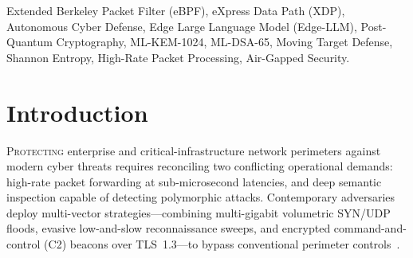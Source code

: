 \documentclass[journal]{IEEEtran}
\renewcommand{\_}{\textunderscore\allowbreak}
\begin{document}
\begin{abstract}
Empirical evaluation on a commodity bare-metal gateway (Quad-Core Intel Core
i5-4570~@ 3.20~GHz, Intel 82574L 1~GbE NIC, Ubuntu Server 22.04 LTS, $N=30$
repeated benchmark runs) demonstrated the following results under the tested
configuration: (1)~a 30-run mean per-packet processing latency of
$0.126 \pm 0.007\,\mu\text{s}$, sustaining $1.495 \pm 0.015\,\text{Mpps}$
(equivalent to $1.18\,\text{Gbps}$ replayed Layer-2 frame throughput) with
$26.2 \pm 0.6\%$ CPU utilization and no observed packet loss under the
evaluated saturation workload; these represent a $5.30\times$ throughput and
$\approx\!210\times$ latency improvement over Linux Netfilter ($p < 10^{-15}$,
95\% CI of difference: $[+1.207,\,+1.218]\,\text{Mpps}$); (2)~the Edge-LLM,
evaluated across 210 strictly held-out scenarios (70\% of the 300-scenario corpus),
demonstrated $98.10\%$ accuracy on unseen inputs; (3)~the entropy-based pre-filter
achieved AUC~$=0.916$ (95\% CI: $[0.885,\,0.947]$) across 500 labeled encrypted
flows as a lightweight triage signal; and (4)~MTD-augmented port hopping increased
sequential Nmap scan duration from $12.4\,\text{s}$ to $4.2\,\text{h}$ under the
specified single-host configuration. The key architectural contribution is the
decoupling of deterministic low-latency enforcement from asynchronous semantic reasoning,
enabling sub-microsecond kernel enforcement while local Edge-LLM cognition executes
off the critical path. All benchmark scripts, raw telemetry logs, eBPF source, and
model configuration are publicly archived in the project GitHub repository.
\end{abstract}

\begin{IEEEkeywords}
Extended Berkeley Packet Filter (eBPF), eXpress Data Path (XDP),
Autonomous Cyber Defense, Edge Large Language Model (Edge-LLM),
Post-Quantum Cryptography, ML-KEM-1024, ML-DSA-65, Moving Target Defense,
Shannon Entropy, High-Rate Packet Processing, Air-Gapped Security.
\end{IEEEkeywords}

\IEEEpeerreviewmaketitle

\section{Introduction}
\lettrine[lines=3,loversize=0.08,findent=2pt,nindent=0pt]{P}{rotecting} enterprise
and critical-infrastructure network perimeters against modern cyber threats requires
reconciling two conflicting operational demands: high-rate packet forwarding at sub-microsecond
latencies, and deep semantic inspection capable of detecting polymorphic attacks.
Contemporary adversaries deploy multi-vector strategies---combining multi-gigabit volumetric
SYN/UDP floods, evasive low-and-slow reconnaissance sweeps, and encrypted command-and-control
(C2) beacons over TLS~1.3---to bypass conventional perimeter
controls~\cite{sarhan2022standard,mirsky2018kitsune}.
\end{document}
